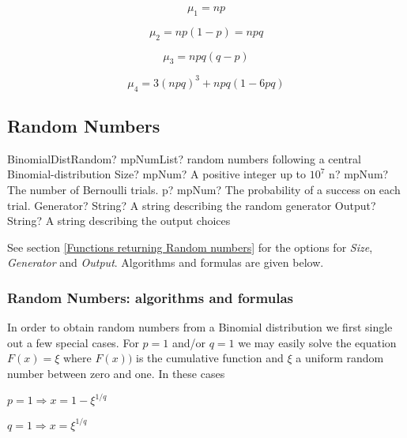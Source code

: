 \begin{equation} 
	\mu_1 = np
\end{equation}

\begin{equation} 
	\mu_2 = np(1-p) = npq
\end{equation}

\begin{equation} 
	\mu_3 = npq(q-p)
\end{equation}

\begin{equation} 
	\mu_4 = 3(npq)^3 + npq(1-6pq)
\end{equation}





\subsection{Random Numbers}

\begin{mpFunctionsExtract}
	\mpFunctionFiveNotImplemented
	{BinomialDistRandom? mpNumList? random numbers following a central Binomial-distribution}
	{Size? mpNum? A positive integer up to $10^7$}
	{n? mpNum? The number of Bernoulli trials.}
	{p? mpNum? The probability of a success on each trial.}
	{Generator? String? A string describing the random generator}
	{Output? String? A string describing the output choices}
\end{mpFunctionsExtract}

\vspace{0.3cm}

See section \ref{Functions returning Random numbers} for the options for  {\itshape\sffamily Size},  {\itshape\sffamily Generator} and {\itshape\sffamily Output}. Algorithms and formulas are given below.

\subsubsection{Random Numbers: algorithms and formulas}
In order to obtain random numbers from a Binomial distribution we first single out a few special cases.
For $p = 1$ and/or $q = 1$ we may easily solve the equation $F(x) = \xi$ where $F(x))$ is the cumulative function and $\xi$ a uniform random number between zero and one. In these cases

\begin{center}
	
	$p = 1 \Rightarrow x = 1 - \xi^{1/q}$
	
	$q = 1 \Rightarrow x = \xi^{1/q}$
	
\end{center}


